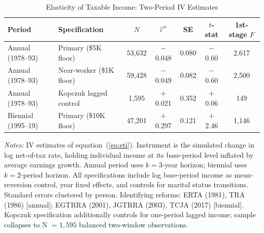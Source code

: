 \documentclass[12pt]{article}
\theoremstyle{definition}
\theoremstyle{remark}
\begin{document}
\begin{table}[htbp]
\centering
\caption{Elasticity of Taxable Income: Two-Period IV Estimates}
\label{tab:eti}
\begin{threeparttable}
\small
\setlength{\tabcolsep}{4pt}
\begin{tabular}{l p{3.5cm} c c c c c}
\toprule
Period & Specification & $N$ & $\hat{\varepsilon}^w$ & SE & $t$-stat & 1st-stage $F$ \\
\midrule
Annual (1978--93) & Primary (\$5K floor) & 53,632 & $-$0.048 & 0.080 & $-$0.60 & 2,617 \\
Annual (1978--93) & Near-worker (\$1K floor) & 59,428 & $-$0.049 & 0.082 & $-$0.60 & 2,500 \\
Annual (1978--93) & Kopczuk lagged control & 1,595 & $+$0.021 & 0.352 & $+$0.06 & 149 \\
\midrule
Biennial (1995--19) & Primary (\$10K floor) & 47,201 & $+$0.297 & 0.121 & $+$2.46 & 1,146 \\
\bottomrule
\end{tabular}
\begin{tablenotes}
\small
\item \textit{Notes:} IV estimates of equation~(\ref{eq:eti}). Instrument is the simulated
change in log net-of-tax rate, holding individual income at its base-period level inflated by
average earnings growth. Annual period uses $k = 3$-year horizon; biennial uses $k = 2$-period
horizon. All specifications include log base-period income as mean-reversion control, year fixed
effects, and controls for marital status transitions. Standard errors clustered by person.
Identifying reforms: ERTA (1981), TRA (1986) [annual]; EGTRRA (2001), JGTRRA (2003),
TCJA (2017) [biennial]. Kopczuk specification additionally controls for one-period lagged
income; sample collapses to N $= 1{,}595$ balanced two-window observations.
\end{tablenotes}
\end{threeparttable}
\end{table}
\end{document}

